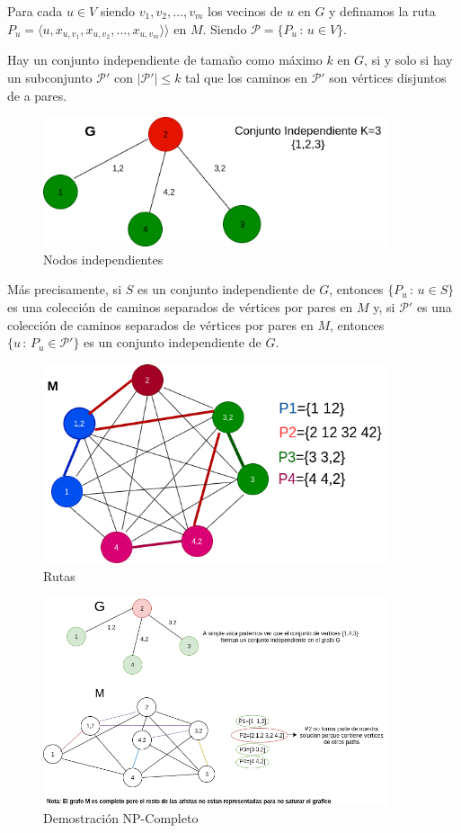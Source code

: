 Para cada $u \in V$ siendo $v_1, v_2, \dots, v_m$ los vecinos de $u$ en $G$ y definamos la ruta $P_u = \langle u, x_{u,v_1}, x_{u,v_2}, \dots, x_{u,v_m} \rangle⟩$ en $M$. Siendo $\mathcal{P} = \{P_u \, : \, u \in V\}$.\newline

Hay un conjunto independiente de tamaño como máximo $k$ en $G$, si y solo si hay un subconjunto $\mathcal{P}'$ con $|\mathcal{P}'| \le k$ tal que los caminos en $\mathcal{P}'$ son vértices disjuntos de a pares.

\begin{figure}[H]
\centering
\includegraphics[width=0.9\textwidth]{Informe/Imagenes/Parte1/grafico 4.png}
\caption{\label{fig:class01}Nodos independientes}
\end{figure}

Más precisamente, si $S$ es un conjunto independiente de $G$, entonces $\{ P_u \, : \, u \in S \}$ es una colección de caminos separados de vértices por pares en $M$ y, si $\mathcal{P}'$ es una colección de caminos separados de vértices por pares en $M$, entonces $\{u \, : \, P_u \in \mathcal{P}' \}$ es un conjunto independiente de $G$.

\begin{figure}[H]
\centering
\includegraphics[width=0.9\textwidth]{Informe/Imagenes/Parte1/grafico 3.png}
\caption{\label{fig:class01}Rutas}
\end{figure}

\begin{figure}[H]
\centering
\includegraphics[width=0.9\textwidth]{Informe/Imagenes/Parte1/grafico 5.png}
\caption{\label{fig:class01}Demostración NP-Completo}
\end{figure}


